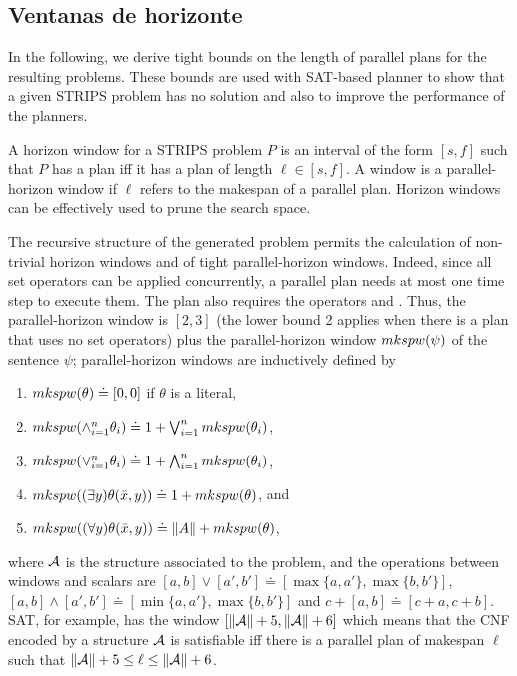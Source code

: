 \subsection{Ventanas de horizonte}

In the following, we derive tight bounds on the length
of parallel plans for the resulting problems. These bounds
are used with SAT-based planner to show that a given
STRIPS problem has no solution and also to improve the
performance of the planners.

A horizon window for a STRIPS problem $P$ is an
interval of the form $[s,f]$ such that $P$ has a
plan iff it has a plan of length $\ell\in[s,f]$.
A window is a parallel-horizon window if $\ell$
refers to the makespan of a parallel plan.
Horizon windows can be effectively used to prune
the search space.

The recursive structure of the generated problem
permits the calculation of non-trivial horizon
windows and of tight parallel-horizon windows.
Indeed, since all set operators can be applied
concurrently, a parallel plan needs at most one
time step to execute them. The plan also requires
the operators  and .
Thus, the parallel-horizon window is $[2,3]$ (the lower
bound 2 applies when there is a plan that uses no
set operators) plus the parallel-horizon window
$mkspw(\psi)$ of the sentence $\psi$;
parallel-horizon windows are inductively defined by
\begin{enumerate}[--]
\item $mkspw(\theta)\doteq [0,0]$ if $\theta$ is a literal,
\item $mkspw(\wedge_{i=1}^n \theta_i)\doteq 1+\bigvee_{i=1}^n mkspw(\theta_i)$,
\item $mkspw(\vee_{i=1}^n \theta_i)\doteq 1+\bigwedge_{i=1}^n mkspw(\theta_i)$,
\item $mkspw((\exists y)\theta(\bar x,y))\doteq 1+mkspw(\theta)$, and
\item $mkspw((\forall y)\theta(\bar x,y))\doteq \|A\|+mkspw(\theta)$,
\end{enumerate}
where $\mathcal{A}$ is the structure associated to the problem,
and the operations between windows and scalars are
$[a,b]\vee[a',b']\doteq[\max\{a,a'\},\max\{b,b'\}]$,
$[a,b]\wedge[a',b']\doteq[\min\{a,a'\},\max\{b,b'\}]$ and
$c+[a,b]\doteq[c+a,c+b]$.
SAT, for example, has the window $[\|\mathcal{A}\|+5,\|\mathcal{A}\|+6]$
which means that the CNF encoded by a structure $\mathcal{A}$
is satisfiable iff there is a parallel plan of
makespan $\ell$ such that $\|\mathcal{A}\|+5\leq\ell\leq\|\mathcal{A}\|+6$.


